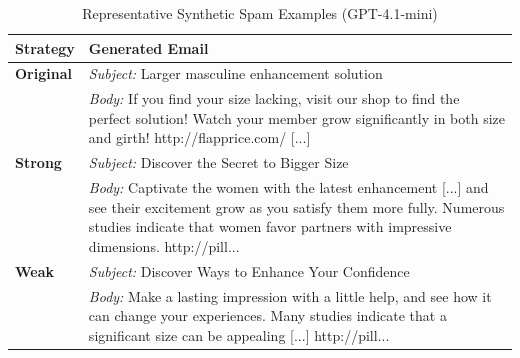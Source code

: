 \begin{table}[t]
\centering
\caption{Representative Synthetic Spam Examples (GPT-4.1-mini)}
\label{tab:spam_examples_gpt}
\small
\begin{tabular}{p{}p{}}
\toprule
\textbf{Strategy} & \textbf{Generated Email} \\
\midrule
\textbf{Original} &
\textit{Subject:} Larger masculine enhancement solution \\
& \textit{Body:} If you find your size lacking, visit our shop to find the perfect solution! Watch your member grow significantly in both size and girth! http://flapprice.com/ [...] \\
\midrule
\textbf{Strong} &
\textit{Subject:} Discover the Secret to Bigger Size \\
& \textit{Body:} Captivate the women with the latest enhancement [...] and see their excitement grow as you satisfy them more fully. Numerous studies indicate that women favor partners with impressive dimensions. http://pill... \\
\midrule
\textbf{Weak} &
\textit{Subject:} Discover Ways to Enhance Your Confidence \\
& \textit{Body:} Make a lasting impression with a little help, and see how it can change your experiences. Many studies indicate that a significant size can be appealing [...] http://pill... \\
\bottomrule
\end{tabular}
\end{table}
